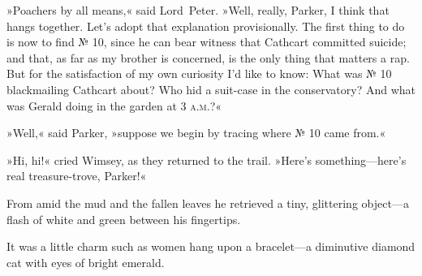 »Poachers by all means,« said Lord~Peter. »Well, really, Parker, I think that hangs together. Let's adopt that explanation provisionally. The first thing to do is now to find № 10, since he can bear witness that Cathcart committed suicide; and that, as far as my brother is concerned, is the only thing that matters a rap. But for the satisfaction of my own curiosity I'd like to know: What was № 10 blackmailing Cathcart about? Who hid a suit-case in the conservatory? And what was Gerald doing in the garden at 3 \textsc{a.m.}?«

»Well,« said Parker, »suppose we begin by tracing where № 10 came from.«

»Hi, hi!« cried Wimsey, as they returned to the trail. »Here's something—here's real treasure-trove, Parker!«

From amid the mud and the fallen leaves he retrieved a tiny, glittering object—a flash of white and green between his fingertips.

It was a little charm such as women hang upon a bracelet—a diminutive diamond cat with eyes of bright emerald.